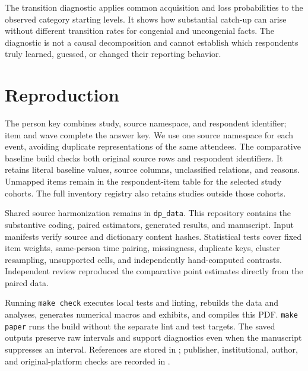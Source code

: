 The transition diagnostic applies common acquisition and loss probabilities to the observed category starting levels. It shows how substantial catch-up can arise without different transition rates for congenial and uncongenial facts. The diagnostic is not a causal decomposition and cannot establish which respondents truly learned, guessed, or changed their reporting behavior.

\begin{table}[H]
\centering\small
\caption{Danish catch-up under a common-transition diagnostic.}

\end{table}

\section{Reproduction}

The person key combines study, source namespace, and respondent identifier; item and wave complete the answer key. We use one source namespace for each event, avoiding duplicate representations of the same attendees. The comparative baseline build checks both original source rows and respondent identifiers. It retains literal baseline values, source columns, unclassified relations, and reasons. Unmapped items remain in the respondent-item table for the selected study cohorts. The full inventory registry also retains studies outside those cohorts.

Shared source harmonization remains in \texttt{dp\_data}. This repository contains the substantive coding, paired estimators, generated results, and manuscript. Input manifests verify source and dictionary content hashes. Statistical tests cover fixed item weights, same-person time pairing, missingness, duplicate keys, cluster resampling, unsupported cells, and independently hand-computed contrasts. Independent review reproduced the comparative point estimates directly from the paired data.

Running \texttt{make check} executes local tests and linting, rebuilds the data and analyses, generates numerical macros and exhibits, and compiles this PDF. \texttt{make paper} runs the build without the separate lint and test targets. The saved outputs preserve raw intervals and support diagnostics even when the manuscript suppresses an interval. References are stored in ; publisher, institutional, author, and original-platform checks are recorded in .
